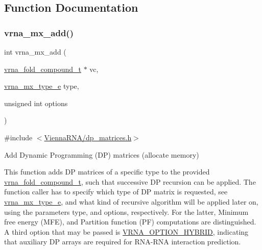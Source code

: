 \subsection{Function Documentation}
\mbox{\label{group__dp__matrices_ga08661f098008961dab0023bf300f0c33}} 
\subsubsection{\texorpdfstring{vrna\+\_\+mx\+\_\+add()}{vrna\_mx\_add()}}
{\footnotesize\ttfamily int vrna\+\_\+mx\+\_\+add (\begin{DoxyParamCaption}\item[{\hyperlink{group__fold__compound_ga1b0cef17fd40466cef5968eaeeff6166}{vrna\+\_\+fold\+\_\+compound\+\_\+t} $\ast$}]{vc,  }\item[{\hyperlink{group__dp__matrices_ga6042ea1d58d01931e959791be6d89343}{vrna\+\_\+mx\+\_\+type\+\_\+e}}]{type,  }\item[{unsigned int}]{options }\end{DoxyParamCaption})}



{\ttfamily \#include $<$\hyperlink{dp__matrices_8h}{Vienna\+R\+N\+A/dp\+\_\+matrices.\+h}$>$}



Add Dynamic Programming (DP) matrices (allocate memory) 

This function adds DP matrices of a specific type to the provided \hyperlink{group__fold__compound_ga1b0cef17fd40466cef5968eaeeff6166}{vrna\+\_\+fold\+\_\+compound\+\_\+t}, such that successive DP recursion can be applied. The function caller has to specify which type of DP matrix is requested, see \hyperlink{group__dp__matrices_ga6042ea1d58d01931e959791be6d89343}{vrna\+\_\+mx\+\_\+type\+\_\+e}, and what kind of recursive algorithm will be applied later on, using the parameters type, and options, respectively. For the latter, Minimum free energy (M\+FE), and Partition function (PF) computations are distinguished. A third option that may be passed is \hyperlink{group__fold__compound_ga8f681fa12b8d4b348bf58415fd1fc82f}{V\+R\+N\+A\+\_\+\+O\+P\+T\+I\+O\+N\+\_\+\+H\+Y\+B\+R\+ID}, indicating that auxiliary DP arrays are required for R\+N\+A-\/\+R\+NA interaction prediction.

